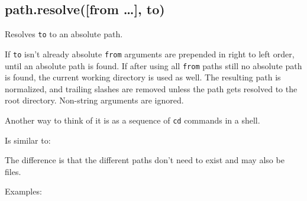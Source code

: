 \subsection{path.resolve({[}from \ldots{}{]}, to)}

Resolves \texttt{to} to an absolute path.

If \texttt{to} isn't already absolute \texttt{from} arguments are
prepended in right to left order, until an absolute path is found. If
after using all \texttt{from} paths still no absolute path is found, the
current working directory is used as well. The resulting path is
normalized, and trailing slashes are removed unless the path gets
resolved to the root directory. Non-string arguments are ignored.

Another way to think of it is as a sequence of \texttt{cd} commands in a
shell.

\begin{Shaded}
\begin{Highlighting}[]
\NormalTok{(}\NormalTok{, }\NormalTok{, }\NormalTok{, }\NormalTok{)}
\end{Highlighting}
\end{Shaded}

Is similar to:

\begin{Shaded}
\begin{Highlighting}[]
 
\end{Highlighting}
\end{Shaded}

The difference is that the different paths don't need to exist and may
also be files.

Examples:

\begin{Shaded}
\begin{Highlighting}[]
\NormalTok{(}\NormalTok{, }\NormalTok{)}

\NormalTok{(}\NormalTok{, }\NormalTok{)}

\NormalTok{(}\NormalTok{, }\NormalTok{, }\NormalTok{)}
\end{Highlighting}
\end{Shaded}

